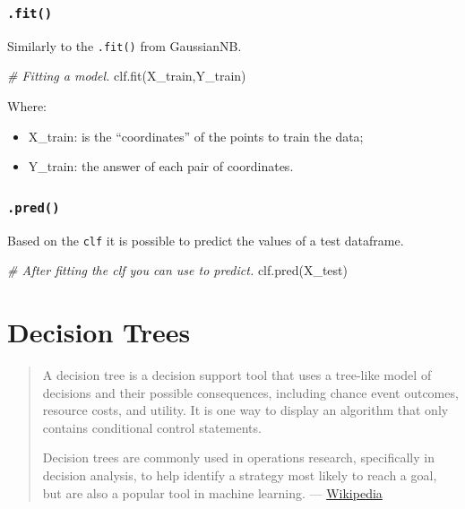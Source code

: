 \documentclass[]{book}
\newenvironment{Shaded}{\begin{snugshade}}{\end{snugshade}}
\newcommand{\CommentTok}[1]{\textcolor[rgb]{0.56,0.35,0.01}{\textit{#1}}}
\newcommand{\NormalTok}[1]{#1}
\providecommand{\tightlist}{%
  \setlength{\itemsep}{0pt}\setlength{\parskip}{0pt}}
\begin{document}
\subsubsection{\texorpdfstring{\texttt{.fit()}}{.fit()}}\label{fit-1}

Similarly to the \texttt{.fit()} from GaussianNB.

\begin{Shaded}
\begin{Highlighting}[]
\CommentTok{# Fitting a model.}
\NormalTok{clf.fit(X_train,Y_train)}
\end{Highlighting}
\end{Shaded}

Where:

\begin{itemize}
\tightlist
\item
  X\_train: is the ``coordinates'' of the points to train the data;
\item
  Y\_train: the answer of each pair of coordinates.
\end{itemize}

\subsubsection{\texorpdfstring{\texttt{.pred()}}{.pred()}}\label{pred}

Based on the \texttt{clf} it is possible to predict the values of a test
dataframe.

\begin{Shaded}
\begin{Highlighting}[]
\CommentTok{# After fitting the clf you can use to predict.}
\NormalTok{clf.pred(X_test)}
\end{Highlighting}
\end{Shaded}

\section{Decision Trees}\label{decision-trees}

\begin{quote}
A decision tree is a decision support tool that uses a tree-like model
of decisions and their possible consequences, including chance event
outcomes, resource costs, and utility. It is one way to display an
algorithm that only contains conditional control statements.

Decision trees are commonly used in operations research, specifically in
decision analysis, to help identify a strategy most likely to reach a
goal, but are also a popular tool in machine learning. ---
\href{https://en.wikipedia.org/wiki/Decision_tree}{Wikipedia}
\end{quote}
\end{document}
